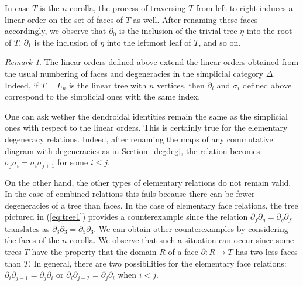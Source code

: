\documentclass[a4paper]{amsart}
\theoremstyle{plain}
\theoremstyle{definition}
\theoremstyle{remark}
\newtheorem{rem}[thm]{Remark}
\newcommand{\To}{\longrightarrow}
\numberwithin{equation}{section}
\numberwithin{figure}{section}
\begin{document}
In case $T$ is the $n$-corolla, the process of traversing $T$ from left to right induces a linear order on the set of faces of $T$ as well. After renaming these faces accordingly, we observe that  $\partial_0$ is the inclusion of the trivial tree $\eta$ into the root of $T$, $\partial_1$ is the inclusion of $\eta$ into the leftmost leaf of $T$, and so on.

\begin{rem}
The linear orders defined above extend the linear orders obtained from the usual numbering of faces and degeneracies in the simplicial category
$\Delta$. Indeed, if $T=L_n$ is the linear tree with $n$ vertices, then $\partial_i$ and $\sigma_i$ defined above correspond to the simplicial ones with the same index.
\end{rem}

One can ask wether the dendroidal identities remain the same as the simplicial ones with respect to the linear orders. This is certainly true for the elementary degeneracy relations. Indeed, after renaming the maps of any commutative diagram with degeneracies as in Section~\ref{degdeg}, the relation becomes $\sigma_j\sigma_i=\sigma_i\sigma_{j+1}$ for some $i\le j$.

On the other hand, the other types of elementary relations do not
remain valid. In the case of combined relations this fails because
there can be fewer degeneracies of a tree than faces. In the case of
elementary face relations, the tree pictured in (\ref{eq:tree1})
provides a counterexample since the relation
$\partial_f\partial_g=\partial_g\partial_f$ translates as
$\partial_3\partial_3=\partial_5\partial_3$. We can obtain other
counterexamples by considering the faces of the $n$-corolla. We
observe that such a situation can occur since some trees $T$ have
the property that the domain $R$ of a face $\partial\colon R\To T$
has two less faces than $T$. In general, there are two possibilities
for the elementary face relations:
$\partial_i\partial_{j-1}=\partial_{j}\partial_i$ or
$\partial_i\partial_{j-2}=\partial_{j}\partial_i$ when $i< j$.
\end{document}
